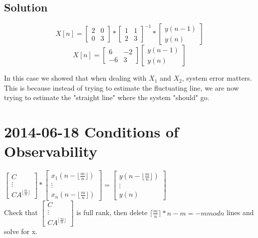 \documentclass[leqno,twocolumn]{article}
\begin{document}
\subsection{Solution}
\[ X[n] = \left[ \begin{matrix}
2 & 0\\ 0 & 3
\end{matrix} \right] * \left[ \begin{matrix}
1 & 1\\ 2 & 3
\end{matrix} \right]^{-1} * \left[ \begin{matrix}
y(n-1) \\ y(n)
\end{matrix} \right] \]
\[ X[n] = \left[ \begin{matrix}
6 & -2\\ -6 & 3
\end{matrix} \right] \left[ \begin{matrix}
y(n-1) \\ y(n)
\end{matrix} \right] \]

In this case we showed that when dealing with $X_1$ and $X_2$, system error matters. This is because instead of trying to estimate the fluctuating line, we are now trying to estimate the "straight line" where the system "should" go.

\section{2014-06-18 Conditions of Observability}
$\left[ \begin{matrix}
C \\ \vdots \\ CA^{\lfloor\frac{m}{n}\rfloor}
\end{matrix} \right] * \left[ \begin{matrix}
x_1(n-\lfloor\frac{m}{n}\rfloor) \\ \vdots \\ x_n(n-\lfloor\frac{m}{n}\rfloor)
\end{matrix} \right] = \left[ \begin{matrix}
y(n-\lfloor\frac{m}{n}\rfloor) \\ \vdots \\ y(n)
\end{matrix} \right] $\\

Check that $\left[ \begin{matrix}
C \\ \vdots \\ CA^{\lfloor\frac{m}{n}\rfloor}
\end{matrix} \right]$ is full rank, then delete $\lceil\frac{m}{n}\rceil*n - m = - m mod n$ lines and solve for x.\\
\end{document}
